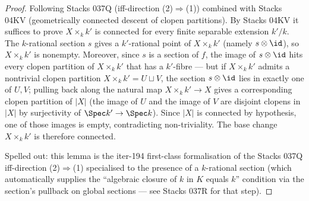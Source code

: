 \begin{proof}
  Following Stacks 037Q (iff-direction (2)\(\Rightarrow\)(1)) combined
  with Stacks 04KV (geometrically connected descent of clopen partitions).
  By Stacks 04KV it suffices to prove \(X \times_k k'\) is connected
  for every finite separable extension \(k'/k\). The
  \(k\)-rational section \(s\) gives a \(k'\)-rational point of
  \(X \times_k k'\) (namely \(s \otimes \id\)), so \(X \times_k k'\) is
  nonempty. Moreover, since \(s\) is a section of \(f\), the image of
  \(s \otimes \id\) hits every clopen partition of \(X \times_k k'\)
  that has a \(k'\)-fibre — but if \(X \times_k k'\) admits a nontrivial
  clopen partition \(X \times_k k' = U \sqcup V\), the section
  \(s \otimes \id\) lies in exactly one of \(U, V\); pulling back along
  the natural map \(X \times_k k' \to X\) gives a corresponding clopen
  partition of \(|X|\) (the image of \(U\) and the image of \(V\)
  are disjoint clopens in \(|X|\) by surjectivity of \(\Spec k' \to \Spec
  k\)). Since \(|X|\) is connected by hypothesis, one of those images is
  empty, contradicting non-triviality. The base change \(X \times_k k'\)
  is therefore connected.

  Spelled out: this lemma is the iter-194 first-class formalisation of
  the Stacks 037Q iff-direction (2)\(\Rightarrow\)(1) specialised to the
  presence of a \(k\)-rational section (which automatically supplies
  the \enquote{algebraic closure of \(k\) in \(K\) equals \(k\)}
  condition via the section's pullback on global sections — see
  Stacks 037R for that step).
\end{proof}


